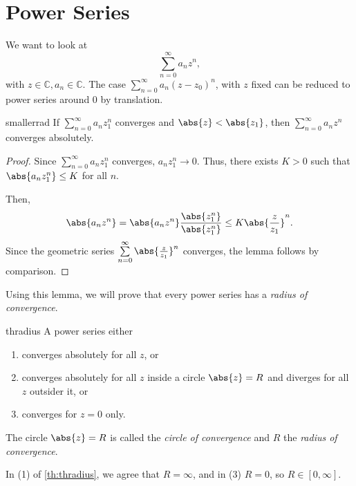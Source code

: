 \section{Power Series}
We want to look at
\[
    \sum\limits_{n=0}^{\infty} a_n z^n,
\]
with \(z \in \mathbb{C}, a_n \in \mathbb{C}\). The case \(\sum\limits_{n=0}^{\infty} a_n (z - z_0)^n\), with \(z\) fixed can be reduced to power series around 0 by translation.
\begin{lemma}{}{smallerrad}
    If \(\sum\limits_{n=0}^{\infty} a_n z_1^n\) converges and \(\abs{z} < \abs{z_1}\), then \(\sum\limits_{n=0}^{\infty} a_n z^n\) converges absolutely.
\end{lemma}
\begin{proof}
    Since \(\sum\limits_{n=0}^{\infty} a_n z_1^n\) converges, \(a_n z_1^n \to 0\). Thus, there exists \( K > 0\) such that \(\abs{a_n z_1^n} \leq K\) for all \(n\).

    Then,
    \[
        \abs{a_n z^n} = \abs{a_n z^n} \frac{\abs{z_1^n}}{\abs{z_1^n}} \leq K \abs{\frac{z}{z_1}}^n.
    \]
    Since the geometric series \(\sum\limits_{n=0}^{\infty} \abs{\frac{z}{z_1}}^n \) converges, the lemma follows by comparison.
\end{proof}
Using this lemma, we will prove that every power series has a \textit{radius of convergence}.
\begin{theorem}{}{thradius}
    A power series either
    \begin{enumerate}
        \item converges absolutely for all \(z\), or
        \item converges absolutely for all \(z\) inside a circle \(\abs{z} = R\) and diverges for all \(z\) outsider it, or
        \item converges for \(z = 0\) only.
    \end{enumerate}
\end{theorem}
\begin{definition}{}{}
    The circle \(\abs{z} = R\) is called the \textit{circle of convergence} and \(R\) the \textit{radius of convergence}.

    In (1) of \cref{th:thradius}, we agree that \(R = \infty\), and in (3) \(R = 0\), so \(R \in [0, \infty]\).
\end{definition}
